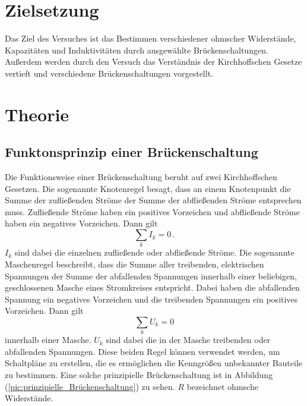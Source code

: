 \section{Zielsetzung}
\label{sec:Zielsetzung}
Das Ziel des Versuches ist das Bestimmen verschiedener ohmscher Widerstände, Kapazitäten und Induktivitäten durch ausgewählte Brückenschaltungen. Außerdem werden 
durch den Versuch das Verständnis der Kirchhoffschen Gesetze vertieft und verschiedene Brückenschaltungen vorgestellt.  

\section{Theorie}
\label{sec:Theorie}
    \subsection{Funktonsprinzip einer Brückenschaltung}
    Die Funktionsweise einer Brückenschaltung beruht auf zwei Kirchhoffschen Gesetzen. Die sogenannte Knotenregel besagt, dass an einem Knotenpunkt die Summe der 
    zufließenden Ströme der Summe der abfließenden Ströme entsprechen muss. Zufließende Ströme haben ein positives Vorzeichen und abfließende Ströme haben ein 
    negatives Vorzeichen. Dann gilt 
    \begin{equation}
        \label{eqn:Knotenregel}
        \sum_k {I_k} = 0 \,.
    \end{equation}
    $I_k$ sind dabei die einzelnen zufließende oder abfließende Ströme. 
    Die sogenannte Maschenregel beschreibt, dass die Summe aller treibenden, elektrischen Spannungen der Summe der abfallenden Spannungen innerhalb einer beliebigen, geschlossenen 
    Masche eines Stromkreises entspricht. Dabei haben die abfallenden Spannung ein negatives Vorzeichen und die treibenden Spannungen ein positives Vorzeichen. 
    Dann gilt
    \begin{equation}
        \label{eqn:Maschenregel}
        \sum_k {U_k} = 0 
    \end{equation}
    innerhalb einer Masche. $U_k$ sind dabei die in der Masche treibenden oder abfallenden Spannungen. 
    Diese beiden Regel können verwendet werden, um Schaltpläne zu erstellen, die es ermöglichen die Kenngrößen unbekannter Bauteile zu bestimmen. Eine 
    solche prinzipielle Brückenschaltung ist in Abbildung (\ref{pic:prinzipielle_Brückenschaltung}) zu sehen. $R$ bezeichnet ohmsche Widerstände.
